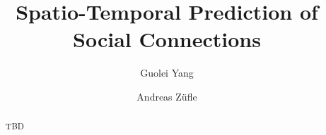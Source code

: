\documentclass[sigconf]{acmart}
\begin{document}



\title{Spatio-Temporal Prediction of Social Connections}


\author{Guolei Yang}

\author{Andreas Z\"ufle}


\begin{abstract}
TBD
\end{abstract}


\iffalse

\begin{CCSXML}
<ccs2012>
<concept>
<concept_id>10002951.10003227.10003236.10003101</concept_id>
<concept_desc>Information systems~Location based services</concept_desc>
<concept_significance>500</concept_significance>
</concept>
<concept>
<concept_id>10002951.10003227.10003351</concept_id>
<concept_desc>Information systems~Data mining</concept_desc>
<concept_significance>500</concept_significance>
</concept>
<concept>
<concept_id>10010147.10010257</concept_id>
<concept_desc>Computing methodologies~Machine learning</concept_desc>
<concept_significance>300</concept_significance>
</concept>
</ccs2012>
\end{CCSXML}

\ccsdesc[500]{Information systems~Location based services}
\ccsdesc[500]{Information systems~Data mining}
\ccsdesc[300]{Computing methodologies~Machine learning}


\keywords{}

\fi

\maketitle






%







\end{document}
